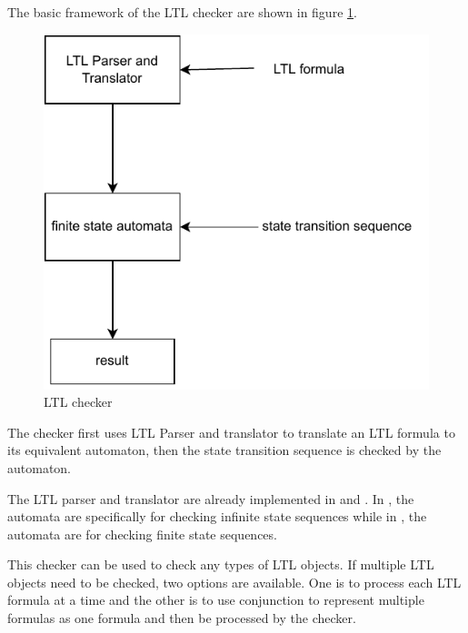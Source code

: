 \documentclass{article}
\begin{document}
The basic framework of the LTL checker are shown in figure \ref{fig:checker}.
\begin{figure}[h!]
    \centering
    \includegraphics[scale=0.5]{translator.pdf}
    \caption{LTL checker}
    \label{fig:checker}
\end{figure}
The checker first uses LTL Parser and translator to translate an LTL formula to its equivalent automaton, then the state transition sequence is checked by the automaton.

The LTL parser and translator are already implemented in \cite{DBLP:books/daglib/0020982} and \cite{DBLP:journals/jlap/HuangC22}.
In \cite{DBLP:books/daglib/0020982}, the automata are specifically for checking infinite state sequences while in \cite{DBLP:journals/jlap/HuangC22}, the automata are for checking finite state sequences.

This checker can be used to check any types of LTL objects. If multiple LTL objects need to be checked, two options are available. One is to process each LTL formula at a time and the other is to use conjunction to represent multiple formulas as one formula and then be processed by the checker.
\end{document}
